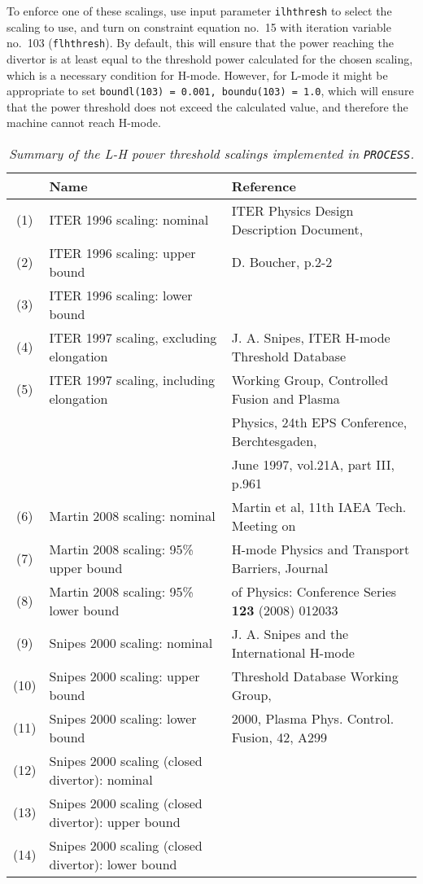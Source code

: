 \documentclass[11pt,a4paper]{report}
\newcommand{\process}{\mbox{\texttt{PROCESS}}}
\begin{document}
To enforce one of these scalings, use input parameter \texttt{ilhthresh} to
select the scaling to use, and turn on constraint equation no.\ 15 with
iteration variable no.\ 103 (\texttt{flhthresh}). By default, this will ensure
that the power reaching the divertor is at least equal to the threshold power
calculated for the chosen scaling, which is a necessary condition for
H-mode. However, for L-mode it might be appropriate to set \texttt{boundl(103)
  = 0.001, boundu(103) = 1.0}, which will ensure that the power threshold does
not exceed the calculated value, and therefore the machine cannot reach
H-mode.

\begin{table}[tbph]
\small
\begin{center}
\begin{tabular}{||c||l||l||} \hline
 & Name & Reference \\ \hline
(1) & ITER 1996 scaling: nominal & ITER Physics Design Description Document, \\
(2) & ITER 1996 scaling: upper bound & D. Boucher, p.2-2 \\
(3) & ITER 1996 scaling: lower bound &  \\ \hline
(4) & ITER 1997 scaling, excluding elongation & J. A. Snipes, ITER H-mode
Threshold Database \\
(5) & ITER 1997 scaling, including elongation &  Working Group, Controlled
Fusion and Plasma \\
 & & Physics, 24th EPS Conference, Berchtesgaden, \\
 & & June 1997, vol.21A, part III, p.961 \\ \hline
(6) & Martin 2008 scaling: nominal & Martin et al, 11th IAEA Tech. Meeting on\\
(7) & Martin 2008 scaling: 95\% upper bound &  H-mode Physics and Transport Barriers, Journal \\
(8) & Martin 2008 scaling: 95\% lower bound &  of Physics: Conference Series \textbf{123}
(2008) 012033 \\ \hline
(9) & Snipes 2000 scaling: nominal & J. A. Snipes and the International H-mode\\
(10) & Snipes 2000 scaling: upper bound & Threshold Database Working Group,\\
(11) & Snipes 2000 scaling: lower bound &  2000, Plasma Phys. Control. Fusion, 42, A299\\
(12) & Snipes 2000 scaling (closed divertor): nominal & \\
(13) & Snipes 2000 scaling (closed divertor): upper bound & \\
(14) & Snipes 2000 scaling (closed divertor): lower bound & \\
\hline
\end{tabular}
\end{center}
\normalsize
\caption[List of available L-H power threshold scalings]
{\label{tab:power_thresholds}
  \textit{Summary of the L-H power threshold scalings implemented in \process.}
}
\end{table}
\end{document}
